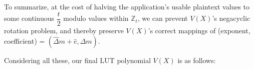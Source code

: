 To summarize, at the cost of halving the application's usable plaintext values to some continuous $\dfrac{t}{2}$ modulo values within $\mathbb{Z}_t$, we can prevent $V(X)$'s negacyclic rotation problem, and thereby preserve $V(X)$'s correct mappings of (exponent, coefficient) = $(\hat{\Delta} m + \hat e, \Delta m)$.

Considering all these, our final LUT polynomial $V(X)$ is as follows:

